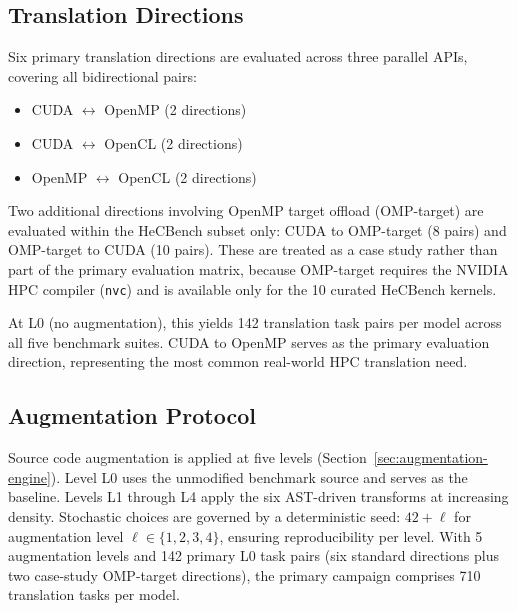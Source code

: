 \documentclass{article}
\begin{document}
\subsection{Translation Directions}
\label{sec:directions}

Six primary translation directions are evaluated across three parallel APIs, covering all bidirectional pairs:

\begin{itemize}
\item CUDA $\leftrightarrow$ OpenMP (2 directions)
\item CUDA $\leftrightarrow$ OpenCL (2 directions)
\item OpenMP $\leftrightarrow$ OpenCL (2 directions)
\end{itemize}

Two additional directions involving OpenMP target offload (OMP-target) are evaluated within the HeCBench subset only: CUDA to OMP-target (8 pairs) and OMP-target to CUDA (10 pairs). These are treated as a case study rather than part of the primary evaluation matrix, because OMP-target requires the NVIDIA HPC compiler (\texttt{nvc}) and is available only for the 10 curated HeCBench kernels.

At L0 (no augmentation), this yields 142 translation task pairs per model across all five benchmark suites. CUDA to OpenMP serves as the primary evaluation direction, representing the most common real-world HPC translation need.

\subsection{Augmentation Protocol}
\label{sec:augmentation-protocol}

Source code augmentation is applied at five levels (Section~\ref{sec:augmentation-engine}). Level L0 uses the unmodified benchmark source and serves as the baseline. Levels L1 through L4 apply the six AST-driven transforms at increasing density. Stochastic choices are governed by a deterministic seed: $42 + \ell$ for augmentation level $\ell \in \{1,2,3,4\}$, ensuring reproducibility per level. With 5 augmentation levels and 142 primary L0 task pairs (six standard directions plus two case-study OMP-target directions), the primary campaign comprises 710 translation tasks per model.
\end{document}

